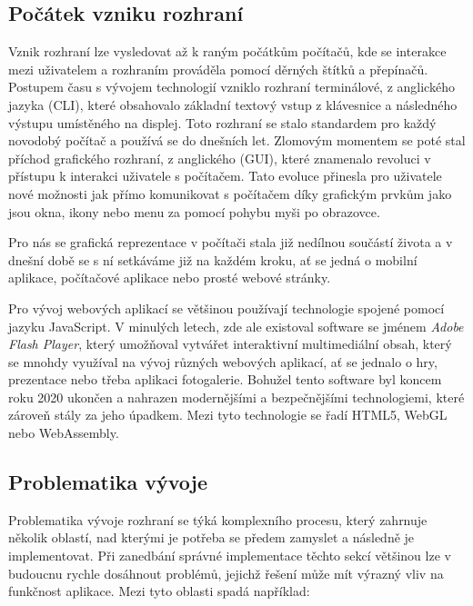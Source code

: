 \subsection{Počátek vzniku rozhraní}
\label{subsec:ui-gui-theory-beginning}
Vznik rozhraní lze vysledovat až k raným počátkům počítačů, kde se interakce mezi uživatelem a rozhraním prováděla pomocí děrných štítků a přepínačů. Postupem času s vývojem technologií vzniklo rozhraní terminálové, z anglického jazyka \textit{} (CLI), které obsahovalo základní textový vstup z klávesnice a následného výstupu umístěného na displej. Toto rozhraní se stalo standardem pro každý novodobý počítač a používá se do dnešních let. Zlomovým momentem se poté stal příchod grafického rozhraní, z anglického \textit{} (GUI), které znamenalo revoluci v přístupu k interakci uživatele s počítačem. Tato evoluce přinesla pro uživatele nové možnosti jak přímo komunikovat s počítačem díky grafickým prvkům jako jsou okna, ikony nebo menu za pomocí pohybu myši po obrazovce.

Pro nás se grafická reprezentace v počítači stala již nedílnou součástí života a v dnešní době se s ní setkáváme již na každém kroku, ať se jedná o mobilní aplikace, počítačové aplikace nebo prosté webové stránky.

Pro vývoj webových aplikací se většinou používají technologie spojené pomocí jazyku JavaScript. V minulých letech, zde ale existoval software se jménem \textit{Adobe Flash Player}, který umožňoval vytvářet interaktivní multimediální obsah, který se mnohdy využíval na vývoj různých webových aplikací, ať se jednalo o hry, prezentace nebo třeba aplikaci fotogalerie. Bohužel tento software byl koncem roku 2020 ukončen a nahrazen modernějšími a bezpečnějšími technologiemi, které zároveň stály za jeho úpadkem. Mezi tyto technologie se řadí HTML5, WebGL nebo WebAssembly. \cite{adobeFlashPlayer-eol}

\subsection{Problematika vývoje}
\label{subsec:ui-gui-theory-problems}
Problematika vývoje rozhraní se týká komplexního procesu, který zahrnuje několik oblastí, nad kterými je potřeba se předem zamyslet a následně je implementovat. Při zanedbání správné implementace těchto sekcí většinou lze v budoucnu rychle dosáhnout problémů, jejichž řešení může mít výrazný vliv na funkčnost aplikace. Mezi tyto oblasti spadá například:

